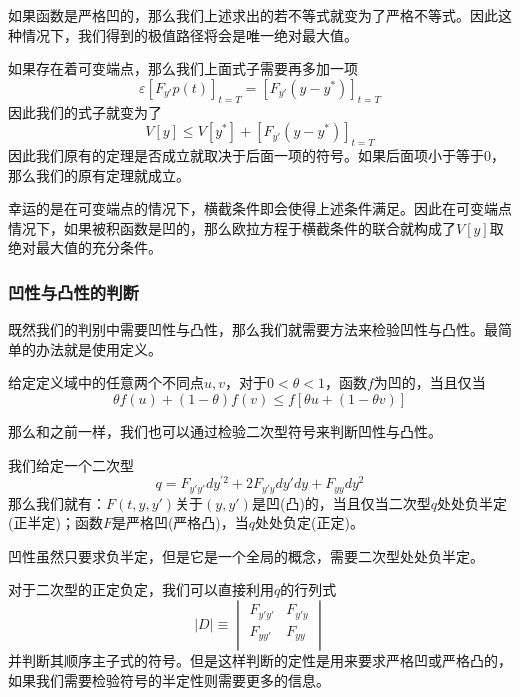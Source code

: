 \documentclass[UTF8,12pt]{ctexart}
\numberwithin{equation}{section} %
\numberwithin{figure}{section}
\numberwithin{table}{section}
\begin{document}
	如果函数是严格凹的，那么我们上述求出的若不等式就变为了严格不等式。因此这种情况下，我们得到的极值路径将会是唯一绝对最大值。
	
	如果存在着可变端点，那么我们上面式子需要再多加一项
	\begin{equation}
		\varepsilon[F_{y'}p(t)]_{t = T} = [F_{y'}(y - y^*)]_{t = T}
	\end{equation}
	因此我们的式子就变为了
	\begin{equation}
		V[y] \leqslant V[y^*] + [F_{y'}(y - y^*)]_{t = T}
	\end{equation}
	因此我们原有的定理是否成立就取决于后面一项的符号。如果后面项小于等于0，那么我们的原有定理就成立。
	
	幸运的是在可变端点的情况下，横截条件即会使得上述条件满足。因此在可变端点情况下，如果被积函数是凹的，那么欧拉方程于横截条件的联合就构成了$V[y]$取绝对最大值的充分条件。
	
	\subsubsection{凹性与凸性的判断}
	既然我们的判别中需要凹性与凸性，那么我们就需要方法来检验凹性与凸性。最简单的办法就是使用定义。
	
	给定定义域中的任意两个不同点$u,v$，对于$0 < \theta < 1$，函数$f$为凹的，当且仅当
	\begin{equation}
		\theta f(u) + (1 - \theta)f(v) \leqslant f[\theta u + (1 - \theta v)]
	\end{equation}
	
	那么和之前一样，我们也可以通过检验二次型符号来判断凹性与凸性。
	
	我们给定一个二次型
	\begin{equation}
		q = F_{y'y'}dy^{'2} + 2F_{y'y}dy'dy + F_{yy}dy^2
	\end{equation}
	那么我们就有：$F(t,y,y')$关于$(y,y')$是凹(凸)的，当且仅当二次型$q$处处负半定(正半定)；函数$F$是严格凹(严格凸)，当$q$处处负定(正定)。
	
	凹性虽然只要求负半定，但是它是一个全局的概念，需要二次型处处负半定。
	
	对于二次型的正定负定，我们可以直接利用$q$的行列式
	\begin{equation}
		|D| \equiv
		\begin{vmatrix}
			F_{y'y'} & F_{y'y} \\
			F_{yy'} & F_{yy} \\
		\end{vmatrix}
	\end{equation}
	并判断其顺序主子式的符号。但是这样判断的定性是用来要求严格凹或严格凸的，如果我们需要检验符号的半定性则需要更多的信息。
	
\end{document}
